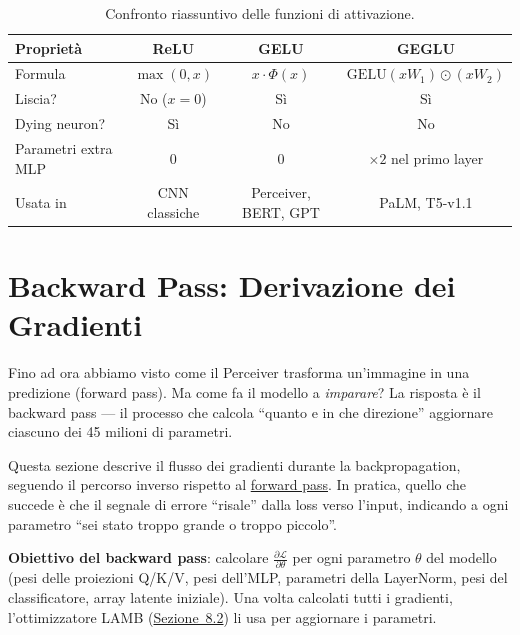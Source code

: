 \documentclass[12pt,a4paper]{article}
\begin{document}
\begin{table}[htbp]
\centering
\caption{Confronto riassuntivo delle funzioni di attivazione.}
\begin{tabular}{@{}lccc@{}}
\toprule
\textbf{Propriet\`a} & \textbf{ReLU} & \textbf{GELU} & \textbf{GEGLU} \\
\midrule
Formula & $\max(0, x)$ & $x \cdot \Phi(x)$ & $\text{GELU}(x W_1) \odot (x W_2)$ \\
Liscia? & No ($x=0$) & S\`i & S\`i \\
Dying neuron? & S\`i & No & No \\
Parametri extra MLP & 0 & 0 & $\times 2$ nel primo layer \\
Usata in & CNN classiche & Perceiver, BERT, GPT & PaLM, T5-v1.1 \\
\bottomrule
\end{tabular}
\end{table}


\newpage
\section{Backward Pass: Derivazione dei Gradienti} \label{sec:backward}

Fino ad ora abbiamo visto come il Perceiver trasforma un'immagine in una predizione (forward pass). Ma come fa il modello a \emph{imparare}? La risposta \`e il backward pass --- il processo che calcola ``quanto e in che direzione'' aggiornare ciascuno dei 45 milioni di parametri.

Questa sezione descrive il flusso dei gradienti durante la backpropagation, seguendo il percorso inverso rispetto al \hyperref[sec:forward]{forward pass}. In pratica, quello che succede \`e che il segnale di errore ``risale'' dalla loss verso l'input, indicando a ogni parametro ``sei stato troppo grande o troppo piccolo''.

\textbf{Obiettivo del backward pass}: calcolare $\frac{\partial \mathcal{L}}{\partial \theta}$ per ogni parametro $\theta$ del modello (pesi delle proiezioni Q/K/V, pesi dell'MLP, parametri della LayerNorm, pesi del classificatore, array latente iniziale). Una volta calcolati tutti i gradienti, l'ottimizzatore LAMB (\hyperref[sec:ottimizzatori]{Sezione~8.2}) li usa per aggiornare i parametri.
\end{document}
